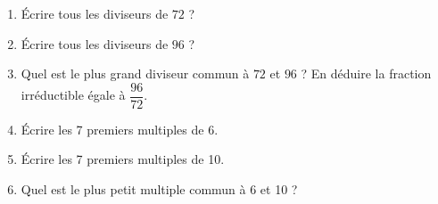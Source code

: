 \begin{minipage}{0.99\linewidth}

\exo



\begin{enumerate}

\item Écrire tous les diviseurs de $72$ ?

\item Écrire tous les diviseurs de $96$ ?

\item Quel est le plus grand diviseur commun à $72$ et $96$ ? En déduire la fraction irréductible égale à $\dfrac{96}{72}$.

\item Écrire les 7 premiers multiples de 6.

\item Écrire les 7 premiers multiples de 10.

\item Quel est le plus petit multiple commun à 6 et 10 ? 


\end{enumerate}

\end{minipage}

\vspace{0.5cm}
